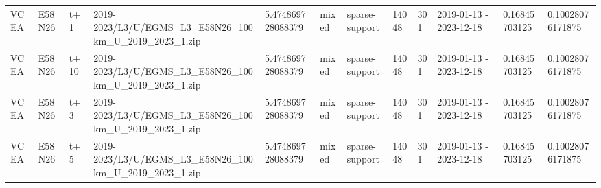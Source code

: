 \begin{landscape}
\begin{longtable}{llllllllllll}
VCEA & E58N26 & t+1 & 2019-2023/L3/U/EGMS\_L3\_E58N26\_100km\_U\_2019\_2023\_1.zip & 5.474869728088379 & mixed & sparse-support & 14048 & 301 & 2019-01-13 - 2023-12-18 & 0.16845703125 & 0.10028076171875 \\
VCEA & E58N26 & t+10 & 2019-2023/L3/U/EGMS\_L3\_E58N26\_100km\_U\_2019\_2023\_1.zip & 5.474869728088379 & mixed & sparse-support & 14048 & 301 & 2019-01-13 - 2023-12-18 & 0.16845703125 & 0.10028076171875 \\
VCEA & E58N26 & t+3 & 2019-2023/L3/U/EGMS\_L3\_E58N26\_100km\_U\_2019\_2023\_1.zip & 5.474869728088379 & mixed & sparse-support & 14048 & 301 & 2019-01-13 - 2023-12-18 & 0.16845703125 & 0.10028076171875 \\
VCEA & E58N26 & t+5 & 2019-2023/L3/U/EGMS\_L3\_E58N26\_100km\_U\_2019\_2023\_1.zip & 5.474869728088379 & mixed & sparse-support & 14048 & 301 & 2019-01-13 - 2023-12-18 & 0.16845703125 & 0.10028076171875 \\
\bottomrule
\end{longtable}
\end{landscape}


